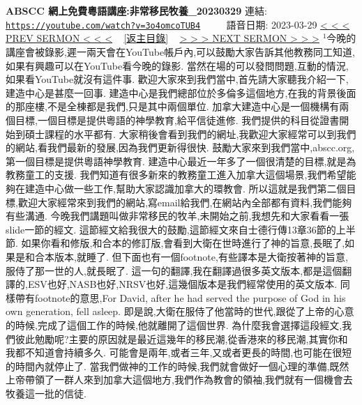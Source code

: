 \documentclass{book}
\begin{document}
\section{}
\label{sec:3o4omcoTUB4}
\textbf{ABSCC 網上免費粵語講座:非常移民牧養\_20230329}
\newline
\newline
連結: \href{https://youtube.com/watch?v=3o4omcoTUB4}{\texttt{https://youtube.com/watch?v=3o4omcoTUB4}} ~~~~ 語音日期: 2023-03-29
\newline
\newline
\hyperref[sec:efm9yyrZOo0]{\small{< < < PREV SERMON < < <}}
~
\hyperref[sec:index]{\small{[返主目錄]}}
~
\hyperref[sec:B5n__dtTRhE]{\small{> > > NEXT SERMON > > >}}
\newline
\newline
$^{1}$今晚的講座會被錄影,遲一兩天會在YouTube帳戶內,可以鼓勵大家告訴其他教務同工知道,如果有興趣可以在YouTube看今晚的錄影.
當然在場的可以發問問題,互動的情況,如果看YouTube就沒有這件事.
歡迎大家來到我們當中,首先請大家聽我介紹一下,建造中心是甚麼一回事.
建造中心是我們總部位於多倫多這個地方,在我的背景後面的那座樓,不是全棟都是我們,只是其中兩個單位.
加拿大建造中心是一個機構有兩個目標,一個目標是提供粵語的神學教育,給平信徒進修.
我們提供的科目從證書開始到碩士課程的水平都有.
大家稍後會看到我們的網址,我歡迎大家經常可以到我們的網站,看我們最新的發展,因為我們更新得很快.
鼓勵大家來到我們當中,abscc.org,第一個目標是提供粵語神學教育.
建造中心最近一年多了一個很清楚的目標,就是為教務童工的支援.
我們知道有很多新來的教務童工進入加拿大這個場景,我們希望能夠在建造中心做一些工作,幫助大家認識加拿大的環教會.
所以這就是我們第二個目標,歡迎大家經常來到我們的網站,寫email給我們,在網站內全部都有資料,我們能夠有些溝通.
今晚我們講題叫做非常移民的牧羊,未開始之前,我想先和大家看看一張slide一節的經文.
這節經文給我很大的鼓勵,這節經文來自士德行傳13章36節的上半節.
如果你看和修版,和合本的修訂版,會看到大衛在世時進行了神的旨意,長眠了,如果是和合本版本,就睡了.
但下面也有一個footnote,有些譯本是大衛按著神的旨意,服侍了那一世的人,就長眠了.
這一句的翻譯,我在翻譯過很多英文版本,都是這個翻譯的,ESV也好,NASB也好,NRSV也好,這幾個版本是我們經常使用的英文版本.
同樣帶有footnote的意思,For David, after he had served the purpose of God in his own generation, fell asleep.
即是說,大衛在服侍了他當時的世代,跟從了上帝的心意的時候,完成了這個工作的時候,他就離開了這個世界.
為什麼我會選擇這段經文,我們彼此勉勵呢?主要的原因就是最近這幾年的移民潮,從香港來的移民潮,其實你和我都不知道會持續多久.
可能會是兩年,或者三年,又或者更長的時間,也可能在很短的時間內就停止了.
當我們做神的工作的時候,我們就會做好一個心理的準備,既然上帝帶領了一群人來到加拿大這個地方,我們作為教會的領袖,我們就有一個機會去牧養這一批的信徒.
\end{document}
